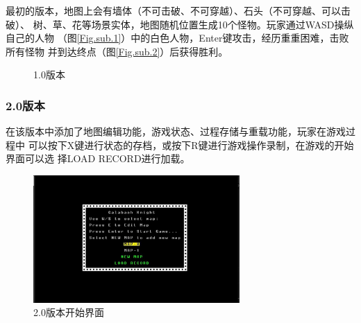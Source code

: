 \documentclass{SCIS2022cn}
\begin{document}
最初的版本，地图上会有墙体（不可击破、不可穿越）、石头（不可穿越、可以击破）、
树、草、花等场景实体，地图随机位置生成10个怪物。玩家通过WASD操纵自己的人物
（图\ref{Fig.sub.1}）中的白色人物，Enter键攻击，经历重重困难，击败所有怪物
并到达终点（图\ref{Fig.sub.2}）后获得胜利。

\begin{figure}[H]
    \centering
    \caption{1.0版本}
    \label{Fig.f121}
\end{figure}

\subsubsection{2.0版本}

在该版本中添加了地图编辑功能，游戏状态、过程存储与重载功能，玩家在游戏过程中
可以按下X键进行状态的存档，或按下R键进行游戏操作录制，在游戏的开始界面可以选
择LOAD RECORD进行加载。

\begin{figure}[H]
    \centering
    \includegraphics[width=0.7\textwidth]{ref/1-2-2-1.jpg}
    \caption{2.0版本开始界面}
    \label{Fig.f1221}
\end{figure}
\end{document}
